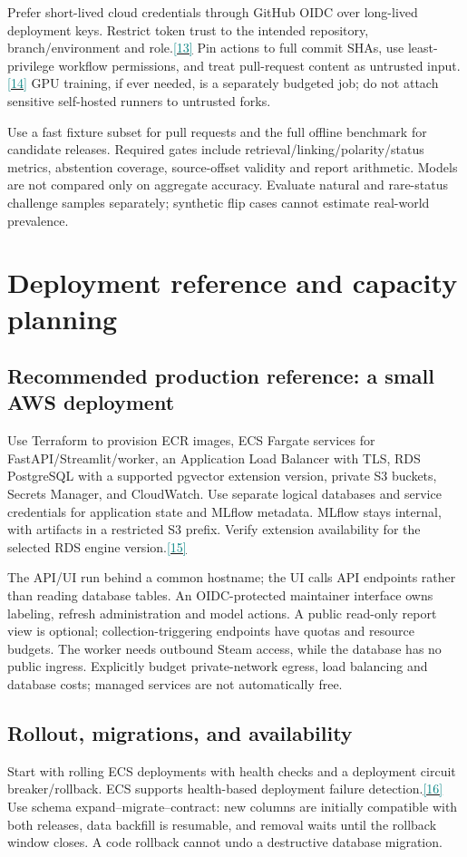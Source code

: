 \documentclass[10pt,letterpaper]{article}
\newcommand{\sr}[1]{\hyperlink{src#1}{\textcolor{teal}{[#1]}}}
\newcommand{\nextsection}[1]{\clearpage\section{#1}}
\begin{document}
Prefer short-lived cloud credentials through GitHub OIDC over long-lived deployment keys. Restrict token trust to the intended repository, branch/environment and role.\sr{13} Pin actions to full commit SHAs, use least-privilege workflow permissions, and treat pull-request content as untrusted input.\sr{14} GPU training, if ever needed, is a separately budgeted job; do not attach sensitive self-hosted runners to untrusted forks.

Use a fast fixture subset for pull requests and the full offline benchmark for candidate releases. Required gates include retrieval/linking/polarity/status metrics, abstention coverage, source-offset validity and report arithmetic. Models are not compared only on aggregate accuracy. Evaluate natural and rare-status challenge samples separately; synthetic flip cases cannot estimate real-world prevalence.

\nextsection{Deployment reference and capacity planning}
\subsection{Recommended production reference: a small AWS deployment}
Use Terraform to provision ECR images, ECS Fargate services for FastAPI/Streamlit/worker, an Application Load Balancer with TLS, RDS PostgreSQL with a supported pgvector extension version, private S3 buckets, Secrets Manager, and CloudWatch. Use separate logical databases and service credentials for application state and MLflow metadata. MLflow stays internal, with artifacts in a restricted S3 prefix. Verify extension availability for the selected RDS engine version.\sr{15}

The API/UI run behind a common hostname; the UI calls API endpoints rather than reading database tables. An OIDC-protected maintainer interface owns labeling, refresh administration and model actions. A public read-only report view is optional; collection-triggering endpoints have quotas and resource budgets. The worker needs outbound Steam access, while the database has no public ingress. Explicitly budget private-network egress, load balancing and database costs; managed services are not automatically free.

\subsection{Rollout, migrations, and availability}
Start with rolling ECS deployments with health checks and a deployment circuit breaker/rollback. ECS supports health-based deployment failure detection.\sr{16} Use schema expand--migrate--contract: new columns are initially compatible with both releases, data backfill is resumable, and removal waits until the rollback window closes. A code rollback cannot undo a destructive database migration.
\end{document}
